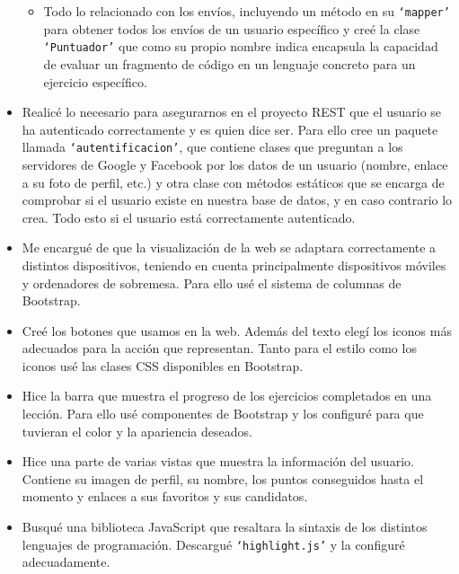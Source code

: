 \begin{itemize}
\begin{itemize}
\item
Todo lo relacionado con los envíos, incluyendo un método en su \texttt{`mapper'} para obtener todos los envíos de un usuario específico y creé la clase \texttt{`Puntuador'} que como su propio nombre indica encapsula la capacidad de evaluar un fragmento de código en un lenguaje concreto para un ejercicio específico.
\end{itemize}
    
\item
Realicé lo necesario para asegurarnos en el proyecto REST que el usuario se ha autenticado correctamente y es quien dice ser. Para ello cree un paquete llamada \texttt{`autentificacion'}, que contiene clases que preguntan a los servidores de Google y Facebook por los datos de un usuario (nombre, enlace a su foto de perfil, etc.) y otra clase con métodos estáticos que se encarga de comprobar si el usuario existe en nuestra base de datos, y en caso contrario lo crea. Todo esto si el usuario está correctamente autenticado.

\item
Me encargué de que la visualización de la web se adaptara correctamente a distintos dispositivos, teniendo en cuenta principalmente dispositivos móviles y ordenadores de sobremesa. Para ello usé el sistema de columnas de Bootstrap.

\item
Creé los botones que usamos en la web. Además del texto elegí los iconos más adecuados para la acción que representan. Tanto para el estilo como los iconos usé las clases CSS disponibles en Bootstrap.

\item
Hice la barra que muestra el progreso de los ejercicios completados en una lección. Para ello usé componentes de Bootstrap y los configuré para que tuvieran el color y la apariencia deseados.

\item
Hice una parte de varias vistas que muestra la información del usuario. Contiene su imagen de perfil, su nombre, los puntos conseguidos hasta el momento y enlaces a sus favoritos y sus candidatos.

\item
Busqué una biblioteca JavaScript que resaltara la sintaxis de los distintos lenguajes de programación. Descargué \texttt{`highlight.js'} y la configuré adecuadamente.


\end{itemize}
